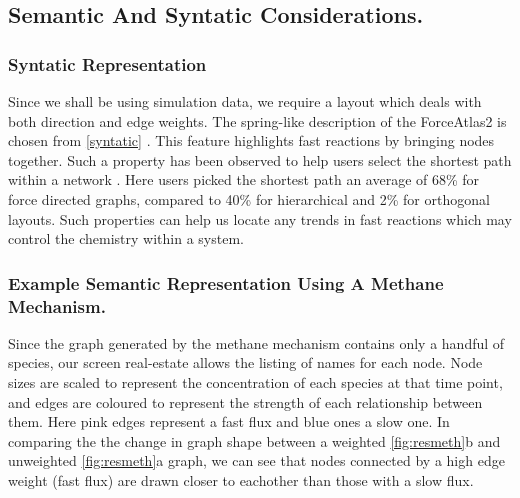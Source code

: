\subsection{Semantic And Syntatic Considerations.}

\subsubsection{Syntatic Representation} 
Since we shall be using simulation data, we require a layout which deals with both direction and edge weights. The spring-like description of the  ForceAtlas2 is chosen from \autoref{syntatic} . This feature highlights fast reactions by bringing nodes together. Such a property has been observed to help users select the shortest path within a network \citep{eyetrack}. Here users picked the shortest path an average of 68\% for force directed graphs, compared to 40\% for hierarchical and 2\% for orthogonal layouts. Such properties can help us locate any trends in fast reactions which may control the chemistry within a system. 


\subsubsection{Example Semantic Representation Using A Methane Mechanism.}
Since the graph generated by the methane mechanism  contains only a handful of species, our screen real-estate allows the listing of names for each node. Node sizes are scaled to represent the concentration of each species at that time point, and edges are coloured to represent the strength of each relationship between them. Here pink edges represent a fast flux and blue ones a slow one. In comparing the the change in graph shape between a weighted \autoref{fig:resmeth}b and unweighted \autoref{fig:resmeth}a graph, we can see that nodes connected by a high edge weight (fast flux) are drawn closer to eachother than those with a slow flux.



